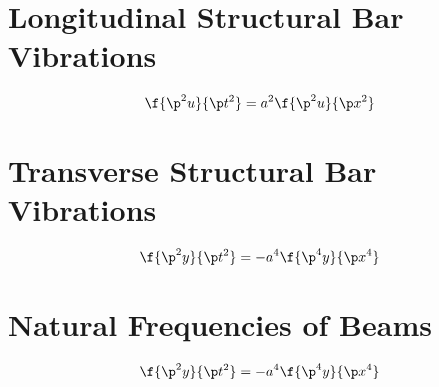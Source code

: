 \chapter{Longitudinal Structural Bar Vibrations}
\begin{comment}
Structural Archives
\end{comment}
$$\f{\p^2 u}{\p t^2} = a^2\f{\p^2 u}{\p x^2}$$
\chapter{Transverse Structural Bar Vibrations}
\begin{comment}
Structural Archives
\end{comment}
$$\f{\p^2 y}{\p t^2} = -a^4\f{\p^4 y}{\p x^4}$$
\chapter{Natural Frequencies of Beams}
\begin{comment}
Structural Archives
\end{comment}
$$\f{\p^2 y}{\p t^2} = -a^4\f{\p^4 y}{\p x^4}$$
